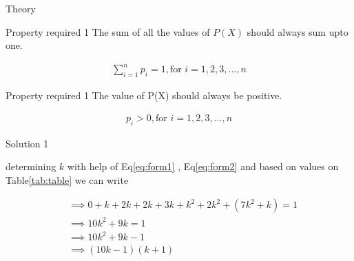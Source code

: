 \documentclass{beamer}
\providecommand{\brak}[1]{\ensuremath{\left(#1\right)}}
\begin{document}
\begin{frame}{Theory}

        \begin{block}{Property required 1}
                The sum of all the values of $P(X)$ should always sum upto one.
                
                       \begin{align}
                              \sum^{n}_{i = 1}p_i = 1, \text{for $i = {1,2,3,...,n}$}
                              \label{eq:form1}
                       \end{align}
        \end{block}
        
        \begin{block}{Property required 1}
                 The value of P(X) should always be positive.
                 
                       \begin{align}
                              p_i>0, \text{for $i = {1,2,3,...,n}$}
                              \label{eq:form2}
                       \end{align}
                       
        \end{block}
        
\end{frame}



\begin{frame}{Solution 1}

       \begin{block}{determining $k$}
                with help of Eq\eqref{eq:form1} , Eq\eqref{eq:form2} and based on values on Table\ref{tab:table} we can write
                
                        \begin{align}
                           &\implies 0 + k + 2k + 2k + 3k + k^{2} + 2k^{2} + ( 7k^{2} + k )   =  1 \\
                           &\implies 10k^{2} + 9k = 1 \\
                           &\implies 10k^{2} + 9k - 1 \\
                           &\implies \brak{10k - 1}\brak{k+1} 
                        \end{align}
       \end{block}

\end{frame}
\end{document}

